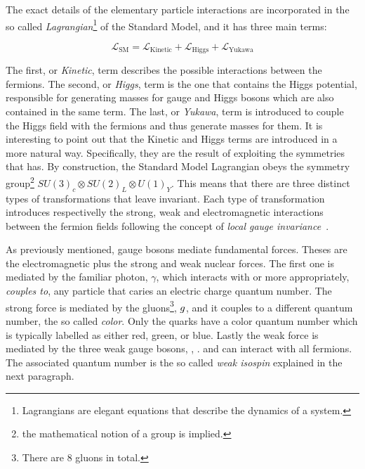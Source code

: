 The exact details of the elementary particle interactions are incorporated in the so called
{\it Lagrangian}\footnote{ Lagrangians are elegant equations that describe the dynamics of a system.} of the Standard Model,
and it has three main terms:

\begin{equation}
\mathscr{L}_{\text{SM}} =
\mathscr{L}_{\text{Kinetic}} + \mathscr{L}_{\text{Higgs}} + \mathscr{L}_{\text{Yukawa}}
\label{lagrangian}
\end{equation}

\noindent The first, or {\it Kinetic}, term describes the possible interactions between the fermions.
The second, or {\it Higgs}, term is the one that contains the Higgs potential, responsible for generating
masses for gauge and Higgs bosons which are also contained in the same term.
The last, or {\it Yukawa}, term is introduced to couple the Higgs field with the fermions and thus generate masses for them.
It is interesting to point out that the Kinetic and Higgs terms are introduced in a more natural way.
Specifically, they are the result of exploiting the symmetries that  has.
By construction, the Standard Model Lagrangian obeys the symmetry group\footnote{the mathematical notion of a group is implied.}
$SU(3)_c\otimes SU(2)_L\otimes U(1)_Y$. This means that there are three distinct types of transformations
that leave  invariant. Each type of transformation introduces respectivelly the strong,
weak and electromagnetic interactions between the fermion fields following the concept of {\it local gauge invariance}~\cite{aitchison}.

As previously mentioned, gauge bosons mediate fundamental forces. Theses are the electromagnetic plus the strong and weak nuclear forces.
The first one is mediated by the familiar photon, $\gamma$, which interacts with or more appropriately, {\it couples to}, any particle that
caries an electric charge quantum number. The strong force is mediated by the gluons\footnote{There are 8 gluons in total.}, $g$,
and it couples to a different quantum number, the so called {\it color}.
Only the quarks have a color quantum number which is typically labelled as either red, green, or blue. Lastly the
weak force is mediated by the three weak gauge bosons, \Wpm, \Z. and can interact with all fermions. The associated quantum number is
the so called {\it weak isospin} explained in the next paragraph.

